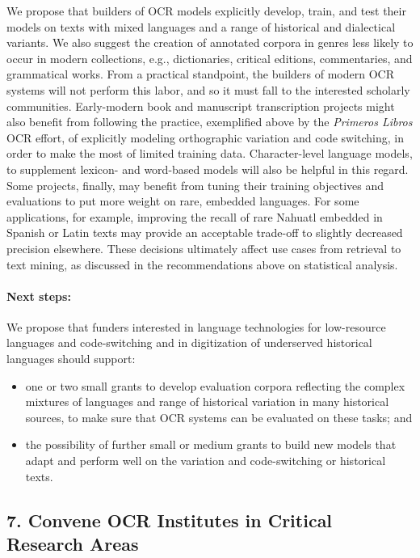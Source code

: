 \documentclass[twoside,11pt]{report}
\begin{document}
We propose that builders of OCR models explicitly develop, train, and test their models on texts with mixed languages and a range of historical and dialectical variants. We also suggest the creation of annotated corpora in genres less likely to occur in modern collections, e.g., dictionaries, critical editions, commentaries, and grammatical works. From a practical standpoint, the builders of modern OCR systems will not perform this labor, and so it must fall to the interested scholarly communities. Early-modern book and manuscript transcription projects might also benefit from following the practice, exemplified above by the \emph{Primeros Libros} OCR effort, of explicitly modeling orthographic variation and code switching, in order to make the most of limited training data. Character-level language models, to supplement lexicon- and word-based models will also be helpful in this regard. Some projects, finally, may benefit from tuning their training objectives and evaluations to put more weight on rare, embedded languages. For some applications, for example, improving the recall of rare Nahuatl embedded in Spanish or Latin texts may provide an acceptable trade-off to slightly decreased precision elsewhere. These decisions ultimately affect use cases from retrieval to text mining, as discussed in the recommendations above on statistical analysis.

\paragraph{Next steps:} We propose that funders interested in language technologies for low-resource languages and code-switching and in digitization of underserved historical languages should support:
\begin{itemize}

\item one or two small grants to develop evaluation corpora reflecting the complex mixtures of languages and range of historical variation in many historical sources, to make sure that OCR systems can be evaluated on these tasks; and

\item the possibility of further small or medium grants to build new models that adapt and perform well on the variation and code-switching or historical texts.

\end{itemize}

\subsection{7. Convene OCR Institutes in Critical Research Areas}
\label{sec:rec-institutes}
\end{document}
